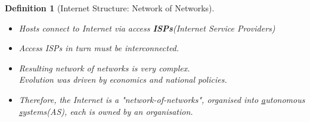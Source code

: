 \documentclass[12pt]{article}
\newtheorem{definition}{Definition}[section]
\theoremstyle{definition}
\begin{document}
\begin{definition}[Internet Structure: Network of Networks]
\hfill\\\normalfont
\vspace{-1em}
\begin{itemize}
  \item Hosts connect to Internet via access \textbf{ISPs}(Internet Service Providers)
  \item Access ISPs in turn must be interconnected.
  \item Resulting network of networks is very complex.\\Evolution was driven by \textit{economics} and \textit{national policies}.
  \item Therefore, the Internet is a "network-of-networks", organised into \underline{a}utonomous \underline{s}ystems(AS), each is owned by an organisation.
\end{itemize}
\end{definition}
\vspace{-1em}
\end{document}
